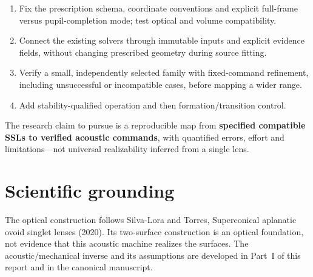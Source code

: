 \begin{enumerate}
\def\labelenumi{\arabic{enumi}.}
\tightlist
\item
  Fix the prescription schema, coordinate conventions and explicit
  full-frame versus pupil-completion mode; test optical and volume
  compatibility.
\item
  Connect the existing solvers through immutable inputs and explicit
  evidence fields, without changing prescribed geometry during source
  fitting.
\item
  Verify a small, independently selected family with fixed-command
  refinement, including unsuccessful or incompatible cases, before
  mapping a wider range.
\item
  Add stability-qualified operation and then formation/transition
  control.
\end{enumerate}

The research claim to pursue is a reproducible map from
\textbf{specified compatible SSLs to verified acoustic commands}, with
quantified errors, effort and limitations---not universal realizability
inferred from a single lens.

\section{Scientific grounding}\label{scientific-grounding}

The optical construction follows Silva-Lora and Torres, {Superconical
aplanatic ovoid singlet lenses} \cite{silva2020} (2020). Its two-surface
construction is an optical foundation, not evidence that this acoustic
machine realizes the surfaces. The acoustic/mechanical inverse and its
assumptions are developed in Part~I of this report and in the canonical
manuscript.
